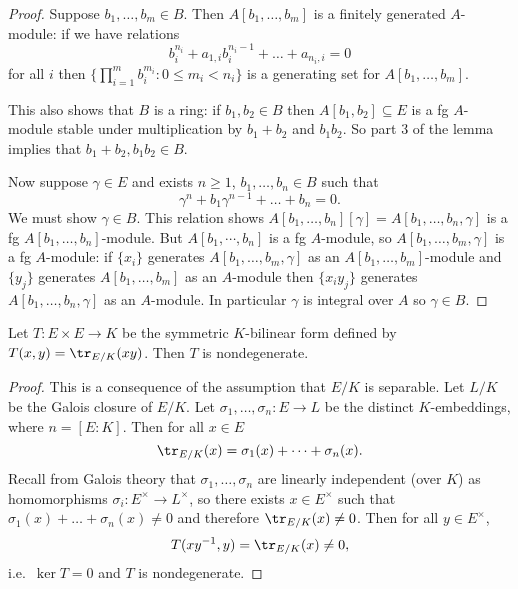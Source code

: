 \documentclass[a4paper]{article}
\begin{document}
\begin{proof}
  Suppose \(b_1, \dots, b_m \in B\). Then \(A[b_1, \dots, b_m]\) is a finitely generated \(A\)-module: if we have relations
  \[
    b_i^{n_i} + a_{1, i} b_i^{n_i - 1} + \dots + a_{n_i, i} = 0
  \]
  for all \(i\) then \(\{\prod_{i = 1}^m b_i^{m_i}: 0 \leq m_i < n_i\}\) is a generating set for \(A[b_1, \dots, b_m]\).

  This also shows that \(B\) is a ring: if \(b_1, b_2 \in B\) then \(A[b_1, b_2] \subseteq E\) is a fg \(A\)-module stable under multiplication by \(b_1 + b_2\) and \(b_1b_2\). So part 3 of the lemma implies that \(b_1 + b_2, b_1b_2 \in B\).

  Now suppose \(\gamma \in E\) and exists \(n \geq 1\), \(b_1, \dots, b_n \in B\) such that
  \[
    \gamma^n + b_1 \gamma^{n - 1} + \dots + b_n = 0.
  \]
  We must show \(\gamma \in B\). This relation shows \(A[b_1, \dots, b_n][\gamma] = A[b_1, \dots, b_n, \gamma]\) is a fg \(A[b_1, \dots, b_n]\)-module. But \(A[b_1, \cdots, b_n]\) is a fg \(A\)-module, so \(A[b_1, \dots, b_m, \gamma]\) is a fg \(A\)-module: if \(\{x_i\}\) generates \(A[b_1, \dots, b_m, \gamma]\) as an \(A[b_1, \dots, b_m]\)-module and \(\{y_j\}\) generates \(A[b_1, \dots, b_m]\) as an \(A\)-module then \(\{x_i y_j\}\) generates \(A[b_1, \dots, b_n, \gamma]\) as an \(A\)-module. In particular \(\gamma\) is integral over \(A\) so \(\gamma \in B\).
\end{proof}

\begin{lemma}
  Let \(T: E \times E \to K\) be the symmetric \(K\)-bilinear form defined by \(T(x, y) = \tr_{E/K} (xy)\). Then \(T\) is nondegenerate.
\end{lemma}

\begin{proof}
  This is a consequence of the assumption that \(E/K\) is separable. Let \(L/K\) be the Galois closure of \(E/K\). Let \(\sigma_1, \dots, \sigma_n: E \to L\) be the distinct \(K\)-embeddings, where \(n = [E: K]\). Then for all \(x \in E\)
  \[
    \tr_{E/K}(x) = \sigma_1(x) + \dots + \sigma_n(x).
  \]
  Recall from Galois theory that \(\sigma_1, \dots, \sigma_n\) are linearly independent (over \(K\)) as homomorphisms \(\sigma_i: E^\times \to L^\times\), so there exists \(x \in E^\times\) such that \(\sigma_1(x) + \dots + \sigma_n(x) \neq 0\) and therefore \(\tr_{E/K}(x) \neq 0\). Then for all \(y \in E^\times\),
  \[
    T(xy^{-1}, y) = \tr_{E/K}(x) \neq 0,
  \]
  i.e.\ \(\ker T = 0\) and \(T\) is nondegenerate.
\end{proof}
\end{document}
